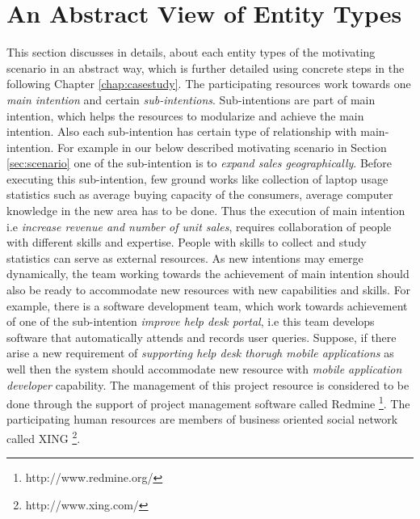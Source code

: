 \section{An Abstract View of Entity Types}
\label{sec:entities}
This section discusses in details, about each entity types of the motivating scenario in an abstract way, which is further detailed using concrete steps in the following Chapter \ref{chap:casestudy}. The participating resources work towards one \textit{main intention} and certain \textit{sub-intentions}. Sub-intentions are part of main intention, which helps the resources to modularize and achieve the main intention. Also each sub-intention has certain type of relationship with main-intention. For example in our below described motivating scenario in Section \ref{sec:scenario} one of the sub-intention is to \textit{expand sales geographically}. Before executing this sub-intention, few ground works like collection of laptop usage statistics such as average buying capacity of the consumers, average computer knowledge in the new area has to be done. Thus the execution of main intention i.e \textit{increase revenue and number of unit sales}, requires collaboration of people with different skills and expertise. People with skills to collect and study statistics can serve as external resources. As new intentions may emerge dynamically, the team working towards the achievement of main intention should also be ready to accommodate new resources with new capabilities and skills. For example, there is a software development team, which work towards achievement of one of the sub-intention \textit{improve help desk portal}, i.e this team develops software that automatically attends and records user queries. Suppose, if there arise a new requirement of \textit{supporting help desk thorugh mobile applications} as well then the system should accommodate new resource with \textit{mobile application developer} capability. The management of this project resource is considered to be done through the support of project management software called Redmine \footnote{http://www.redmine.org/}. The participating human resources are members of business oriented social network called XING \footnote{http://www.xing.com/}.

